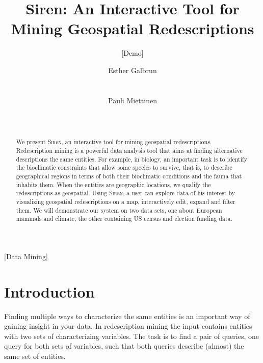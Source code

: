\documentclass{sig-alternate}
\begin{document}
\setlength{\pdfpageheight}{11in}%
\setlength{\pdfpagewidth}{8.5in}%


\title{Siren: An Interactive Tool for Mining Geospatial Redescriptions}
\subtitle{[Demo]}

\author{
\alignauthor
Esther Galbrun\\
       \\
       \\
\alignauthor
Pauli Miettinen\\
       \\
       \\
}

\maketitle
\begin{abstract}
  We present \textsc{Siren}, an interactive tool for mining geospatial
  redescriptions.  Redescription mining is a powerful data analysis
  tool that aims at finding alternative descriptions the same
  entities.  For example, in biology, an important task is to identify
  the bioclimatic constraints that allow some species to survive, that
  is, to describe geographical regions in terms of both their
  bioclimatic conditions and the fauna that inhabits them.  When the
  entities are geographic locations, we qualify the redescriptions as
  geospatial.  Using \textsc{Siren}, a user can explore data of his
  interest by visualizing geospatial redescriptions on a map,
  interactively edit, expand and filter them.  We will demonstrate our
  system on two data sets, one about European mammals and climate, the
  other containing US census and election funding data.
\end{abstract}

[Data Mining]



\section{Introduction}
Finding multiple ways to characterize the same entities is an important way of gaining insight in your data.
In
redescription mining the input contains entities with two sets of
characterizing variables. The task is to find a pair of queries, one
query for both sets of variables, such that both queries describe
(almost) the same set of entities.
\end{document}
